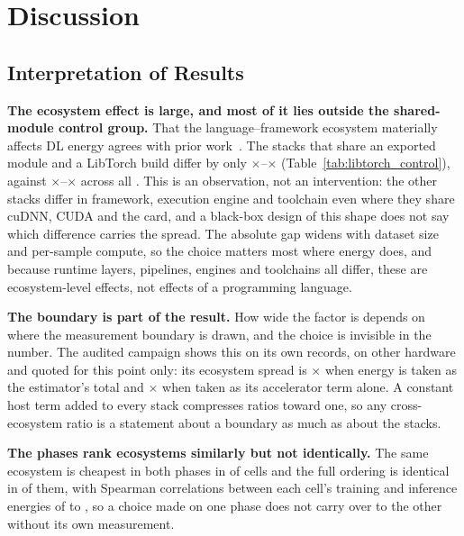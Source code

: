 \section{Discussion}
\label{sec:discussion}

\subsection{Interpretation of Results}
\label{subsec:interpretation}

\textbf{The ecosystem effect is large, and most of it lies outside the
shared-module control group.} That the language--framework ecosystem materially
affects DL energy agrees with prior
work~\citep{georgiou2022green,marini2025green,pereira2021ranking,gordillo2024ranking}.
The \vCtrlStacks{} stacks that share an exported module and a LibTorch build
differ by only \vCtrlSpreadMin$\times$--\vCtrlSpreadMax$\times$
(Table~\ref{tab:libtorch_control}), against
\vSpreadTrainMin$\times$--\vSpreadTrainMax$\times$ across all \vEcosystems{}.
This is an observation, not an intervention: the other stacks differ in
framework, execution engine and toolchain even where they share cuDNN, CUDA and
the card, and a black-box design of this shape does not say which difference
carries the spread. The absolute gap widens with dataset size and per-sample compute,
so the choice matters most where energy does, and because runtime layers,
pipelines, engines and toolchains all differ, these are ecosystem-level effects,
not effects of a programming language.

\textbf{The boundary is part of the result.} How wide the factor is depends on
where the measurement boundary is drawn, and the choice is invisible in the
number. The audited campaign shows this on its own records, on other hardware
and quoted for this point only: its ecosystem spread is
\vAuditSpreadConfounded$\times$ when energy is taken as the estimator's total
and \vAuditSpreadGpuOnly$\times$ when taken as its accelerator term alone. A
constant host term added to every stack compresses ratios toward one, so any
cross-ecosystem ratio is a statement about a boundary as much as about the
stacks.

\textbf{The phases rank ecosystems similarly but not identically.} The same
ecosystem is cheapest in both phases in \vPhaseSameBest{} of \vPhaseBlocks{}
cells and the full ordering is identical in \vPhaseIdenticalOrder{} of them,
with Spearman correlations between each cell's training and inference energies
of \vPhaseRhoMin{} to \vPhaseRhoMax, so a choice made on one phase does not
carry over to the other without its own measurement.

